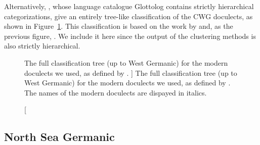 \documentclass[a4paper]{article}
\begin{document}
Alternatively, \citet{hammarstroem2018glottolog},
whose language catalogue Glottolog contains
strictly hierarchical categorizations,
give an entirely tree-like classification of the CWG doculects,
as shown in Figure~\ref{fig:glottolog}.
This classification is based on the work by \citet{stiles2013pan-west}
and, as the previous figure, \citet{harbert2007germanic}.
We include it here since the output of the clustering methods
is also strictly hierarchical.

\begin{figure}[h]
\begin{adjustwidth}{-3cm}{-3cm}
\centering
\scalebox{0.8}{

}
\end{adjustwidth}
% 
\caption
[
The full classification tree (up to West Germanic) for the modern doculects we used,
as defined by \citet{hammarstroem2018glottolog}.
]
{
The full classification tree (up to West Germanic) for the modern doculects we used,
as defined by \citet{hammarstroem2018glottolog}.
The names of the modern doculects are dispayed in italics.
}
\label{fig:glottolog}
\end{figure}

\subsection{North Sea Germanic}
\end{document}
